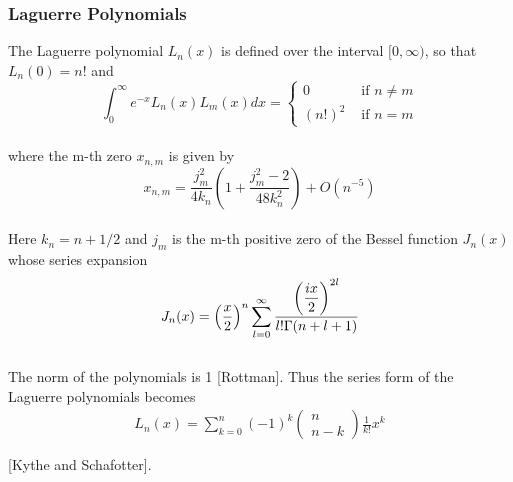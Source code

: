 \documentclass[%
reprint,
amsmath,amssymb,
aps,
]{revtex4-1}
\begin{document}
\subsubsection{Laguerre Polynomials} \noindent 
The Laguerre polynomial $L_n(x)$ is defined over the interval $[0,\infty)$, so that $L_n(0) = n!$ and \vspace{2mm} \\
\begin{equation*}
\int_{0}^{\infty} e^{-x} L_{n}(x) L_{m}(x) d x=\left\{\begin{array}{ll}{0} & {\text { if } n \neq m} \\ {(n !)^{2}} & {\text { if } n=m}\end{array}\right.
\end{equation*}\vspace{2mm} \\
where the m-th zero $x_{n,m}$ is given by \vspace{2mm} \\
\begin{equation}\label{abs_2}
x_{n, m}=\frac{j_{m}^{2}}{4 k_{n}}\left(1+\frac{j_{m}^{2}-2}{48 k_{n}^{2}}\right)+O\left(n^{-5}\right)
\end{equation}\vspace{2mm} \\
Here $k_n = n + 1/2$ and $j_m$ is the m-th positive zero of the Bessel function $J_n(x)$ whose series expansion \vspace{2mm} \\
\begin{equation}\label{bessel}
	J_n(x) = \qty(\dfrac{x}{2})^n\sum_{l=0}^{\infty}\dfrac{\qty(
	\dfrac{ix}{2})^{2l}}{l!\Gamma (n+l+1)}
\end{equation}\vspace{2mm} \\The norm of the polynomials is 1 [Rottman]. Thus the series form of the Laguerre polynomials becomes\vspace{2mm} \\
\begin{align}\label{polylag}
L_{n}(x)=\sum_{k=0}^{n}(-1)^{k}\left(\begin{array}{c}{n} \\ {n-k}\end{array}\right) \frac{1}{k !} x^{k} \\ \nonumber \\ \nonumber 
\end{align}\vspace{2mm} 
\hspace{50mm}[Kythe and Schafotter].
\end{document}
